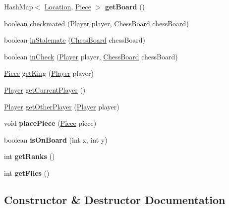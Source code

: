 \begin{DoxyCompactItemize}
Hash\+Map$<$ \hyperlink{class_game_1_1_location}{Location}, \hyperlink{class_game_1_1_piece}{Piece} $>$ {\bfseries get\+Board} ()
\item 
boolean \hyperlink{class_game_1_1_chess_board_a79832c1dee410398129a1d2365819836}{checkmated} (\hyperlink{class_game_1_1_player}{Player} player, \hyperlink{class_game_1_1_chess_board}{Chess\+Board} chess\+Board)
\item 
boolean \hyperlink{class_game_1_1_chess_board_a7a2ec0cc1f431ee502561c18a53a80cf}{in\+Stalemate} (\hyperlink{class_game_1_1_chess_board}{Chess\+Board} chess\+Board)
\item 
boolean \hyperlink{class_game_1_1_chess_board_a7176cdb726816d1a5ce1aabd01c7f706}{in\+Check} (\hyperlink{class_game_1_1_player}{Player} player, \hyperlink{class_game_1_1_chess_board}{Chess\+Board} chess\+Board)
\item 
\hyperlink{class_game_1_1_piece}{Piece} \hyperlink{class_game_1_1_chess_board_af7f79327e5c2e5ed8f60715736e684d2}{get\+King} (\hyperlink{class_game_1_1_player}{Player} player)
\item 
\hyperlink{class_game_1_1_player}{Player} \hyperlink{class_game_1_1_chess_board_af26bbaf05bffe9f911e10ad3e2843c6a}{get\+Current\+Player} ()
\item 
\hyperlink{class_game_1_1_player}{Player} \hyperlink{class_game_1_1_chess_board_a3d8adea17ddbb65aa9e527e711f80c51}{get\+Other\+Player} (\hyperlink{class_game_1_1_player}{Player} player)
\item 
\mbox{\label{class_game_1_1_chess_board_a379b1fc092ee1ff5a14fac5461ae0112}} 
void {\bfseries place\+Piece} (\hyperlink{class_game_1_1_piece}{Piece} piece)
\item 
\mbox{\label{class_game_1_1_chess_board_a61728334465aa8a90a32fe141d67b99d}} 
boolean {\bfseries is\+On\+Board} (int x, int y)
\item 
\mbox{\label{class_game_1_1_chess_board_a14bb6eb4e1b62827762a9089bba60621}} 
int {\bfseries get\+Ranks} ()
\item 
\mbox{\label{class_game_1_1_chess_board_a32690c9ed46310a3b1cb9321e7e4680b}} 
int {\bfseries get\+Files} ()
\end{DoxyCompactItemize}


\subsection{Constructor \& Destructor Documentation}
\mbox{\label{class_game_1_1_chess_board_af03bbcf15fe65eb707758928b92556d7}} 

